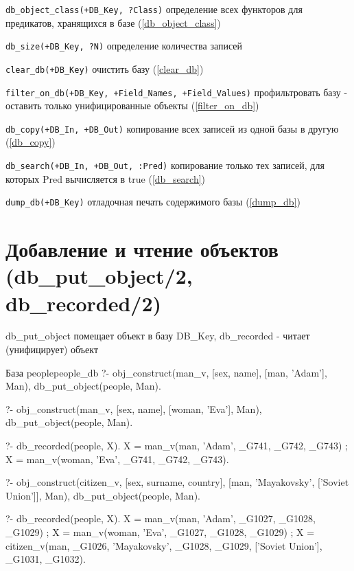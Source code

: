 \documentclass[a4paper]{book}
\begin{document}
\begin{description}

\item \verb|db_object_class(+DB_Key, ?Class)| определение всех
  функторов для предикатов, хранящихся в базе
  (\ref{db_object_class})

\item \verb|db_size(+DB_Key, ?N)| определение количества записей
\item \verb|clear_db(+DB_Key)| очистить базу (\ref{clear_db})
\item \verb|filter_on_db(+DB_Key, +Field_Names, +Field_Values)|
  профильтровать базу - оставить только унифицированные объекты
  (\ref{filter_on_db})
\item \verb|db_copy(+DB_In, +DB_Out)| копирование всех записей из
  одной базы в другую (\ref{db_copy})
\item \verb|db_search(+DB_In, +DB_Out, :Pred)| копирование только
  тех записей, для которых Pred вычисляется в true
  (\ref{db_search})
\item \verb|dump_db(+DB_Key)| отладочная печать содержимого базы
  (\ref{dump_db})
\end{description}


\section{Добавление и чтение объектов (db\_put\_object/2,
  db\_recorded/2)}
\label{db_put_object/2}
\label{db_recorded/2}

db\_put\_object помещает объект в базу DB\_Key, db\_recorded -
читает (унифицирует) объект

\begin{example}{База people}{people_db}
?- obj_construct(man_v, 
      [sex, name], 
      [man, 'Adam'], Man), 
   db_put_object(people, Man).

?- obj_construct(man_v, 
      [sex, name], 
      [woman, 'Eva'], Man), 
   db_put_object(people, Man).

?- db_recorded(people, X).
X = man_v(man, 'Adam', _G741, _G742, _G743) ;
X = man_v(woman, 'Eva', _G741, _G742, _G743).

?- obj_construct(citizen_v, 
      [sex, surname, country], 
      [man, 'Mayakovsky', ['Soviet Union']], Man), 
   db_put_object(people, Man). 

?- db_recorded(people, X).
X = man_v(man, 'Adam', _G1027, _G1028, _G1029) ;
X = man_v(woman, 'Eva', _G1027, _G1028, _G1029) ;
X = citizen_v(man, _G1026, 'Mayakovsky', _G1028, _G1029, ['Soviet Union'], _G1031, _G1032).
\end{example}
\end{document}
